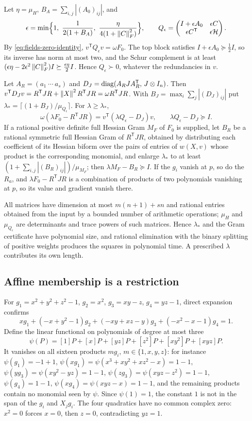 Let $\eta=\mu_H$, $B_A=\sum_{i,j}|(A_0)_{ij}|$, and
\[
 \epsilon=\min\Bigl\{1,\ \frac1{2(1+B_A)},\
   \frac\eta{4(1+\norm C_F^2)}\Bigr\},
 \qquad
 Q_\epsilon=\begin{pmatrix}I+\epsilon A_0&\epsilon C\\
   \epsilon C^{\mathsf T}&\epsilon\mathcal H\end{pmatrix}.
\]
By \eqref{eq:fields-zero-identity}, $v^{\mathsf T}Q_\epsilon v=\omega F_0$. The
top block satisfies $I+\epsilon A_0\succeq\frac12I$, so its inverse has norm
at most two, and the Schur complement is at least
$(\epsilon\eta-2\epsilon^2\left\lVert C\right\rVert_F^2)I\succeq\frac{\epsilon\eta}2I$. Hence
$Q_\epsilon\succ0$, whatever the redundancies in $v$.

Let $A_R=(a_1\ \cdots\ a_s)$ and
$D_J=\operatorname{diag}(A_RJA_R^{\mathsf T},\,J\otimes I_n)$. Then
$v^{\mathsf T}D_Jv=R^{\mathsf T}JR+\left\lVert X\right\rVert^2R^{\mathsf T}JR=\omega R^{\mathsf T}JR$.
With $B_J=\max_i\sum_j|(D_J)_{ij}|$ put
$\lambda_*=\lceil(1+B_J)/\mu_{Q_\epsilon}\rceil$. For $\lambda\ge\lambda_*$,
\[
 \omega(\lambda F_0-R^{\mathsf T}JR)=v^{\mathsf T}(\lambda Q_\epsilon-D_J)v,
 \qquad \lambda Q_\epsilon-D_J\succeq I .
\]
If a rational positive definite full Hessian Gram $M_F$ of $F_0$ is supplied,
let $B_R$ be a rational symmetric full Hessian Gram of $R^{\mathsf T}JR$,
obtained by distributing each coefficient of its Hessian biform over the
pairs of entries of $w(X,v)$ whose product is the corresponding monomial, and
enlarge $\lambda_*$ to at least $(1+\sum_{i,j}|(B_R)_{ij}|)/\mu_{M_F}$; then
$\lambda M_F-B_R\succeq I$. If the $g_i$ vanish at $p$, so do the $R_a$, and
$\lambda F_0-R^{\mathsf T}JR$ is a combination of products of two polynomials
vanishing at $p$, so its value and gradient vanish there.

All matrices have dimension at most $m(n+1)+sn$ and rational entries obtained
from the input by a bounded number of arithmetic operations; $\mu_H$ and
$\mu_{Q_\epsilon}$ are determinants and trace powers of such matrices. Hence
$\lambda_*$ and the Gram certificate have polynomial size, and rational
elimination with the binary splitting of positive weights produces the
squares in polynomial time. A prescribed $\lambda$ contributes its own length.

\subsection{Affine membership is a restriction}
\label{app:fields-membership-example}

For $g_1=x^2+y^2+z^2-1$, $g_2=x^2$, $g_3=xy-z$, $g_4=yz-1$, direct expansion
confirms
\[
 xg_1+(-x+y^2-1)g_2+(-xy+xz-y)g_3+(-x^2-x-1)g_4=1 .
\]
Define the linear functional on polynomials of degree at most three
\[
 \psi(P)=[1]P+[x]P+[yz]P+[z^2]P+[xy^2]P+[xyz]P .
\]
It vanishes on all sixteen products $mg_i$, $m\in\{1,x,y,z\}$: for instance
$\psi(g_1)=-1+1$, $\psi(xg_1)=\psi(x^3+xy^2+xz^2-x)=1-1$,
$\psi(yg_3)=\psi(xy^2-yz)=1-1$, $\psi(zg_3)=\psi(xyz-z^2)=1-1$,
$\psi(g_4)=1-1$, $\psi(xg_4)=\psi(xyz-x)=1-1$, and the remaining products
contain no monomial seen by $\psi$. Since $\psi(1)=1$, the constant $1$ is not
in the span of the $g_i$ and $X_jg_i$. The four quadratics have no common
complex zero: $x^2=0$ forces $x=0$, then $z=0$, contradicting $yz=1$.

